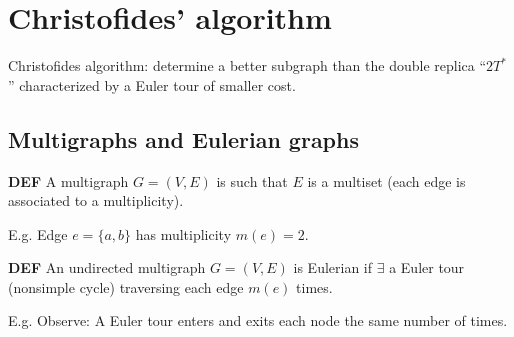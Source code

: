 \section{Christofides' algorithm}
Christofides algorithm: determine a better subgraph than the double replica ``$2T^*$'' characterized by a Euler tour of smaller cost.
\subsection{Multigraphs and Eulerian graphs}
\begin{notesdefinition}
\textbf{DEF} A multigraph $G=(V,E)$ is such that $E$ is a multiset (each edge is associated to a multiplicity).
\end{notesdefinition}
E.g.
Edge $e=\{a,b\}$ has multiplicity $m(e)=2$.
\begin{notesdefinition}
\textbf{DEF} An undirected multigraph $G=(V,E)$ is Eulerian if $\exists$ a Euler tour (nonsimple cycle) traversing each edge $m(e)$ times.
\end{notesdefinition}
E.g.
Observe: A Euler tour enters and exits each node the same number of times.
